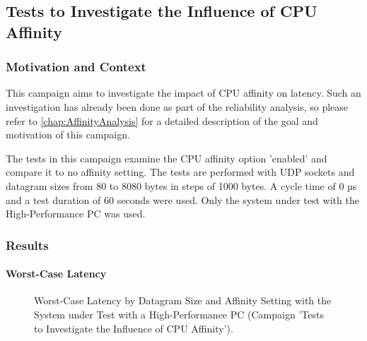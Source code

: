 \subsection{Tests to Investigate the Influence of CPU Affinity}
\subsubsection{Motivation and Context}
This campaign aims to investigate the impact of CPU affinity on latency. Such an investigation has already been done as part of the reliability analysis, so please refer to \ref{chap:AffinityAnalysis} for a detailed description of the goal and motivation of this campaign.

The tests in this campaign examine the CPU affinity option 'enabled' and compare it to no affinity setting. The tests are performed with UDP sockets and datagram sizes from 80 to 8080 bytes in steps of 1000 bytes. A cycle time of 0 µs and a test duration of 60 seconds were used. Only the system under test with the High-Performance PC was used.

\subsubsection{Results}
\paragraph{Worst-Case Latency}

\begin{figure}[h!]
  \centering
  \caption{Worst-Case Latency by Datagram Size and Affinity Setting with the System under Test with a High-Performance PC (Campaign 'Tests to Investigate the Influence of CPU Affinity').}
  \label{fig:AffWc}
\end{figure}

